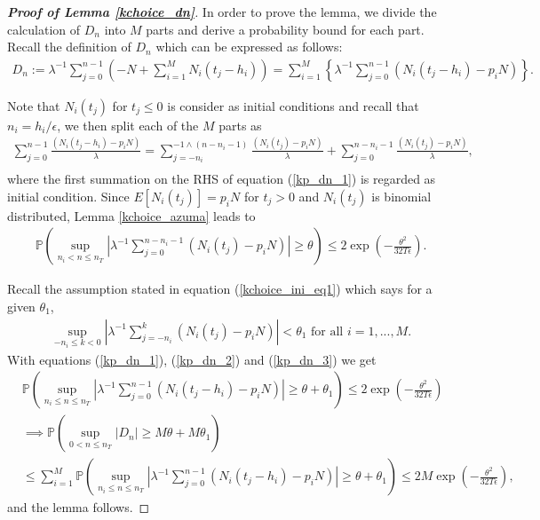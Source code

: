 \documentclass[12pt]{article}
\def\P{\mathbb{P}}
\numberwithin{equation}{section}  %
\begin{document}
\begin{proof}[\textbf{Proof of Lemma \ref{kchoice_dn}}]
In order to prove the lemma, we divide the calculation of $D_n$ into $M$ parts and derive a probability bound for each part. Recall the definition of $D_n$ which can be expressed as follows:
\begin{align*}
D_n:=\lambda^{-1}\sum_{j=0}^{n-1} \left(-N+\sum_{i=1}^M N_i(t_j-h_i)\right)=\sum_{i=1}^M\left\{\lambda^{-1}\sum_{j=0}^{n-1} \left(N_i(t_j-h_i)-p_i N\right)\right\}.
\end{align*}

Note that $N_i(t_j)$ for $t_j\leq0$ is consider as initial conditions and recall that $n_i=h_i/\epsilon$, we then split each of the $M$ parts as
\begin{align}
\sum_{j=0}^{n-1} \frac{\left(N_i(t_j-h_i)-p_i N\right)}{\lambda}=\sum_{j=-n_i}^{-1\land (n-n_i-1)} \frac{\left(N_i(t_j)-p_i N\right)}{\lambda}+\sum_{j=0}^{n-n_i-1} \frac{\left(N_i(t_j)-p_i N\right)}{\lambda},\nonumber\\
\quad\label{kp_dn_1}
\end{align}
where the first summation on the RHS of equation (\ref{kp_dn_1}) is regarded as initial condition. Since $E[N_i(t_j)]=p_iN$ for $t_j>0$ and $N_i(t_j)$ is binomial distributed, Lemma \ref{kchoice_azuma} leads to
\begin{align} 
\P\left(\sup_{n_i< n\leq n_T} \left|\lambda^{-1}\sum_{j=0}^{n-n_i-1} \left(N_i(t_j)-p_i N\right)\right|\geq \theta\right)
\leq 2\exp\left(-\frac{\theta^2}{32T\epsilon}\right)\label{kp_dn_2}.
\end{align}
 
Recall the assumption stated in equation (\ref{kchoice_ini_eq1}) which says for a given $\theta_1$,
\begin{align} 
\sup_{-n_i\leq k<0}\left|\lambda^{-1}\sum_{j=-n_i}^{k} \left(N_i(t_j)-p_iN\right)\right|<\theta_1 \text{ for all }i=1,...,M.\label{kp_dn_3}
\end{align}
With equations (\ref{kp_dn_1}), (\ref{kp_dn_2}) and (\ref{kp_dn_3}) we get
\begin{align*}
&\P\left(\sup_{n_i\leq n\leq n_T} \left|\lambda^{-1}\sum_{j=0}^{n-1} \left(N_i(t_j-h_i)-p_i N\right)\right|\geq \theta+\theta_1\right)\leq 2\exp\left(-\frac{\theta^2}{32T\epsilon}\right)\\
&\implies\P\left(\sup_{0<n\leq n_T}|D_n|\geq M\theta+M\theta_1\right)\\
&\leq \sum_{i=1}^M \P\left(\sup_{n_i\leq n\leq n_T} \left|\lambda^{-1}\sum_{j=0}^{n-1} \left(N_i(t_j-h_i)-p_i N\right)\right|\geq \theta+\theta_1\right)\leq 2M\exp\left(-\frac{\theta^2}{32T\epsilon}\right),
\end{align*}
and the lemma follows. 
\end{proof}
\end{document}
